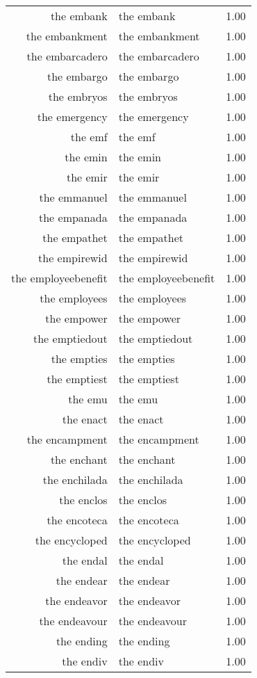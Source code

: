\begin{table}[ht]
\begin{tabular}{rlr}
  the embank & the embank & 1.00 \\ 
  the embankment & the embankment & 1.00 \\ 
  the embarcadero & the embarcadero & 1.00 \\ 
  the embargo & the embargo & 1.00 \\ 
  the embryos & the embryos & 1.00 \\ 
  the emergency & the emergency & 1.00 \\ 
  the emf & the emf & 1.00 \\ 
  the emin & the emin & 1.00 \\ 
  the emir & the emir & 1.00 \\ 
  the emmanuel & the emmanuel & 1.00 \\ 
  the empanada & the empanada & 1.00 \\ 
  the empathet & the empathet & 1.00 \\ 
  the empirewid & the empirewid & 1.00 \\ 
  the employeebenefit & the employeebenefit & 1.00 \\ 
  the employees & the employees & 1.00 \\ 
  the empower & the empower & 1.00 \\ 
  the emptiedout & the emptiedout & 1.00 \\ 
  the empties & the empties & 1.00 \\ 
  the emptiest & the emptiest & 1.00 \\ 
  the emu & the emu & 1.00 \\ 
  the enact & the enact & 1.00 \\ 
  the encampment & the encampment & 1.00 \\ 
  the enchant & the enchant & 1.00 \\ 
  the enchilada & the enchilada & 1.00 \\ 
  the enclos & the enclos & 1.00 \\ 
  the encoteca & the encoteca & 1.00 \\ 
  the encycloped & the encycloped & 1.00 \\ 
  the endal & the endal & 1.00 \\ 
  the endear & the endear & 1.00 \\ 
  the endeavor & the endeavor & 1.00 \\ 
  the endeavour & the endeavour & 1.00 \\ 
  the ending & the ending & 1.00 \\ 
  the endiv & the endiv & 1.00 \\ 

\end{tabular}
\end{table}
